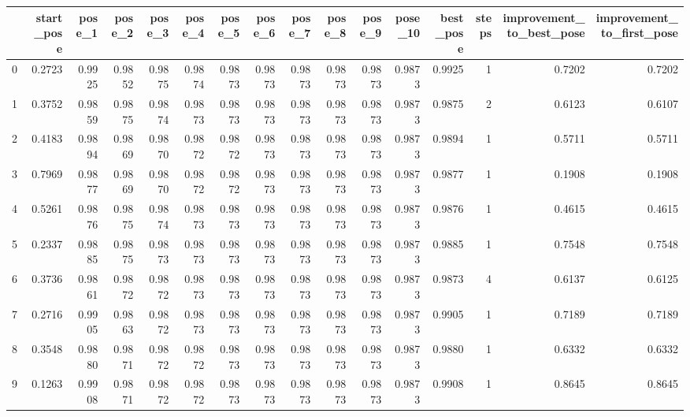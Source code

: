 \begin{tabular}{lrrrrrrrrrrrrrrr}
\toprule
{} &  start\_pose &  pose\_1 &  pose\_2 &  pose\_3 &  pose\_4 &  pose\_5 &  pose\_6 &  pose\_7 &  pose\_8 &  pose\_9 &  pose\_10 &  best\_pose &  steps &  improvement\_to\_best\_pose &  improvement\_to\_first\_pose \\
\midrule
0   &      0.2723 &  0.9925 &  0.9852 &  0.9875 &  0.9874 &  0.9873 &  0.9873 &  0.9873 &  0.9873 &  0.9873 &   0.9873 &     0.9925 &      1 &                    0.7202 &                     0.7202 \\
1   &      0.3752 &  0.9859 &  0.9875 &  0.9874 &  0.9873 &  0.9873 &  0.9873 &  0.9873 &  0.9873 &  0.9873 &   0.9873 &     0.9875 &      2 &                    0.6123 &                     0.6107 \\
2   &      0.4183 &  0.9894 &  0.9869 &  0.9870 &  0.9872 &  0.9872 &  0.9873 &  0.9873 &  0.9873 &  0.9873 &   0.9873 &     0.9894 &      1 &                    0.5711 &                     0.5711 \\
3   &      0.7969 &  0.9877 &  0.9869 &  0.9870 &  0.9872 &  0.9872 &  0.9873 &  0.9873 &  0.9873 &  0.9873 &   0.9873 &     0.9877 &      1 &                    0.1908 &                     0.1908 \\
4   &      0.5261 &  0.9876 &  0.9875 &  0.9874 &  0.9873 &  0.9873 &  0.9873 &  0.9873 &  0.9873 &  0.9873 &   0.9873 &     0.9876 &      1 &                    0.4615 &                     0.4615 \\
5   &      0.2337 &  0.9885 &  0.9875 &  0.9873 &  0.9873 &  0.9873 &  0.9873 &  0.9873 &  0.9873 &  0.9873 &   0.9873 &     0.9885 &      1 &                    0.7548 &                     0.7548 \\
6   &      0.3736 &  0.9861 &  0.9872 &  0.9872 &  0.9873 &  0.9873 &  0.9873 &  0.9873 &  0.9873 &  0.9873 &   0.9873 &     0.9873 &      4 &                    0.6137 &                     0.6125 \\
7   &      0.2716 &  0.9905 &  0.9863 &  0.9872 &  0.9873 &  0.9873 &  0.9873 &  0.9873 &  0.9873 &  0.9873 &   0.9873 &     0.9905 &      1 &                    0.7189 &                     0.7189 \\
8   &      0.3548 &  0.9880 &  0.9871 &  0.9872 &  0.9872 &  0.9873 &  0.9873 &  0.9873 &  0.9873 &  0.9873 &   0.9873 &     0.9880 &      1 &                    0.6332 &                     0.6332 \\
9   &      0.1263 &  0.9908 &  0.9871 &  0.9872 &  0.9872 &  0.9873 &  0.9873 &  0.9873 &  0.9873 &  0.9873 &   0.9873 &     0.9908 &      1 &                    0.8645 &                     0.8645 \\

\end{tabular}

